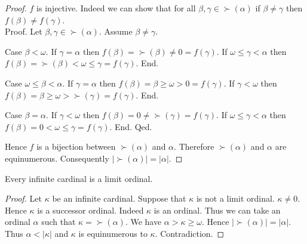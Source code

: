 \documentclass[10pt]{article}
\begin{document}
\begin{forthel}
\begin{proof}
      $f$ is injective.
      Indeed we can show that for all $\beta, \gamma \in \succ(\alpha)$ if
      $\beta \neq \gamma$ then $f(\beta) \neq f(\gamma)$. \\
      Proof.
        Let $\beta, \gamma \in \succ(\alpha)$.
        Assume $\beta \neq \gamma$.

        Case $\beta < \omega$.
          If $\gamma = \alpha$ then
          $f(\beta)
            = \succ(\beta)
            \neq 0
            = f(\gamma)$.
          If $\omega \leq \gamma < \alpha$ then
          $f(\beta)
            = \succ(\beta)
            < \omega
            \leq \gamma
            = f(\gamma)$.
        End.

        Case $\omega \leq \beta < \alpha$.
          If $\gamma = \alpha$ then
          $f(\beta)
            = \beta
            \geq \omega
            > 0
            = f(\gamma)$.
          If $\gamma < \omega$ then
          $f(\beta)
            = \beta
            \geq \omega
            > \succ(\gamma)
            = f(\gamma)$.
        End.

        Case $\beta = \alpha$.
          If $\gamma < \omega$ then
          $f(\beta)
            = 0
            \neq \succ(\gamma)
            = f(\gamma)$.
          If $\omega \leq \gamma < \alpha$ then
          $f(\beta)
            = 0
            < \omega
            \leq \gamma
            = f(\gamma)$.
        End.
      Qed.

      Hence $f$ is a bijection between $\succ(\alpha)$ and $\alpha$.
      Therefore $\succ(\alpha)$ and $\alpha$ are equinumerous.
      Consequently $|\succ(\alpha)| = |\alpha|$.
    \end{proof}
  \end{forthel}

  \begin{forthel}
    \begin{proposition}
      Every infinite cardinal is a limit ordinal.
    \end{proposition}
    \begin{proof}
      Let $\kappa$ be an infinite cardinal.
      Suppose that $\kappa$ is not a limit ordinal.
      $\kappa \neq 0$.
      Hence $\kappa$ is a successor ordinal.
      Indeed $\kappa$ is an ordinal.
      Thus we can take an ordinal $\alpha$ such that $\kappa = \succ(\alpha)$.
      We have $\alpha > \kappa \geq \omega$.
      Hence $|\succ(\alpha)| = |\alpha|$.
      Thus $\alpha < |\kappa|$ and $\kappa$ is equinumerous to $\kappa$.
      Contradiction.
    \end{proof}
  \end{forthel}
\end{document}
